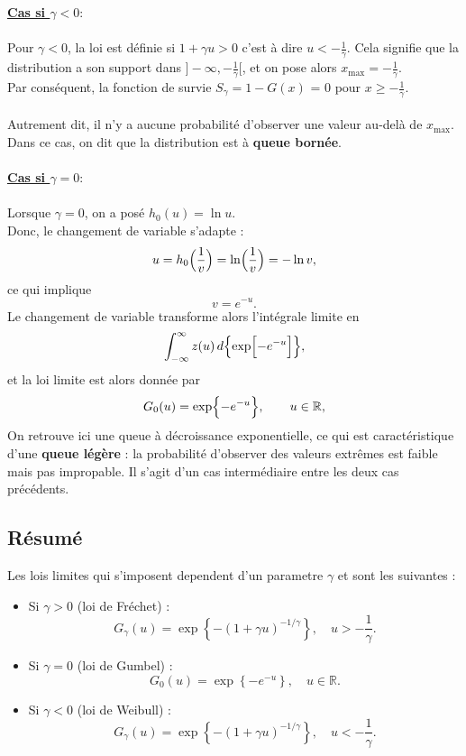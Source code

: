 \documentclass{article}
\theoremstyle{plain}
\theoremstyle{definition}
\theoremstyle{plain}
\begin{document}
\\
\\
\textbf{\underline{Cas si \(\gamma<0 : \)}}
\\
\\
Pour \(\gamma < 0\), la loi est définie si $1 + \gamma u > 0$ c'est à dire $u < - \frac{1}{\gamma}$. Cela signifie que la distribution a son support dans \(]-\infty, - \frac{1}{\gamma} [ \), et on pose alors \(x_{\max} = - \frac{1}{\gamma} \).
\\
Par conséquent, la fonction de survie $S_{\gamma} = 1 - G(x)$ = 0 pour \(x \ge - \frac{1}{\gamma} \).
\\
\\
Autrement dit, il n'y a aucune probabilité d'observer une valeur au-delà de \(x_{\max}\). Dans ce cas, on dit que la distribution est à \textbf{queue bornée}.
\\
\\
\textbf{\underline{Cas si \(\gamma=0 : \)}}
\\
\\
Lorsque \(\gamma = 0\), on a posé $h_0(u)=\ln u$.
\\
Donc, le changement de variable s'adapte : 
\[
u=h_0\Bigl(\frac{1}{v}\Bigr)=\ln\Bigl(\frac{1}{v}\Bigr)=-\ln v,
\]
ce qui implique
\[
v=e^{-u}.
\]
Le changement de variable transforme alors l'intégrale limite en
\[
\int_{-\infty}^{\infty} z(u)\,d\Bigl\{\exp\Bigl[-e^{-u}\Bigr]\Bigr\},
\]
et la loi limite est alors donnée par
\[
G_0(u)=\exp\Bigl\{-e^{-u}\Bigr\},\qquad u\in\mathbb{R},
\]
On retrouve ici une queue à décroissance exponentielle, ce qui est caractéristique d'une \textbf{queue légère} : la probabilité d'observer des valeurs extrêmes est faible mais pas impropable.
Il s'agit d'un cas intermédiaire entre les deux cas précédents.
\\
\subsection{Résumé}
Les lois limites qui s'imposent dependent d'un parametre $\gamma$ et sont les suivantes :
\\
\begin{itemize}
    \item Si \(\gamma>0\) (loi de Fréchet) :
    \[
    G_\gamma(u)=\exp\left\{-\left(1+\gamma u\right)^{-1/\gamma}\right\}, \quad u > -\frac{1}{\gamma}.
    \]
    
    \item Si \(\gamma=0\) (loi de Gumbel) :
    \[
    G_0(u)=\exp\left\{-e^{-u}\right\}, \quad u\in\mathbb{R}.
    \]
    
    \item Si \(\gamma<0\) (loi de Weibull) :
    \[
    G_\gamma(u)=\exp\left\{-\left(1+\gamma u\right)^{-1/\gamma}\right\}, \quad u < -\frac{1}{\gamma}.
    \]
\end{itemize}
\end{document}
